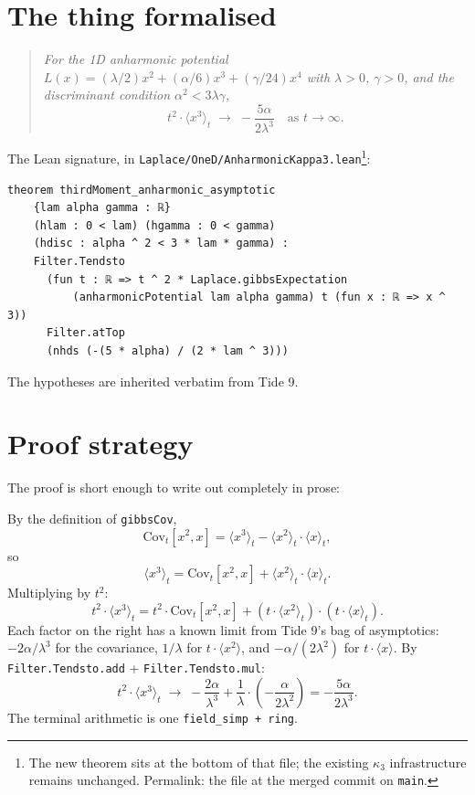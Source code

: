 \documentclass[11pt]{article}
\begin{document}
\section{The thing formalised}

\begin{quote}\itshape
For the 1D anharmonic potential
$L(x) = (\lambda/2) x^2 + (\alpha/6) x^3 + (\gamma/24) x^4$ with
$\lambda > 0$, $\gamma > 0$, and the discriminant condition
$\alpha^2 < 3\lambda\gamma$,
\[
  t^2 \cdot \langle x^3 \rangle_t
  \;\longrightarrow\; -\frac{5\alpha}{2\lambda^3}
  \quad \text{as } t \to \infty.
\]
\end{quote}

The Lean signature, in
\texttt{Laplace/OneD/AnharmonicKappa3.lean}\footnote{The new theorem
sits at the bottom of that file; the existing $\kappa_3$ infrastructure
remains unchanged. Permalink:
the file at the merged commit on \texttt{main}.}:

\begin{verbatim}
theorem thirdMoment_anharmonic_asymptotic
    {lam alpha gamma : ℝ}
    (hlam : 0 < lam) (hgamma : 0 < gamma)
    (hdisc : alpha ^ 2 < 3 * lam * gamma) :
    Filter.Tendsto
      (fun t : ℝ => t ^ 2 * Laplace.gibbsExpectation
          (anharmonicPotential lam alpha gamma) t (fun x : ℝ => x ^ 3))
      Filter.atTop
      (nhds (-(5 * alpha) / (2 * lam ^ 3)))
\end{verbatim}

The hypotheses are inherited verbatim from Tide 9.

\section{Proof strategy}

The proof is short enough to write out completely in prose:

By the definition of \texttt{gibbsCov},
\[
  \mathrm{Cov}_t[x^2, x] = \langle x^3 \rangle_t - \langle x^2 \rangle_t \cdot \langle x \rangle_t,
\]
so
\[
  \langle x^3 \rangle_t = \mathrm{Cov}_t[x^2, x] + \langle x^2 \rangle_t \cdot \langle x \rangle_t.
\]
Multiplying by $t^2$:
\[
  t^2 \cdot \langle x^3 \rangle_t
  = t^2 \cdot \mathrm{Cov}_t[x^2, x]
    + (t \cdot \langle x^2 \rangle_t) \cdot (t \cdot \langle x \rangle_t).
\]
Each factor on the right has a known limit from Tide 9's bag of
asymptotics: $-2\alpha/\lambda^3$ for the covariance, $1/\lambda$ for
$t \cdot \langle x^2 \rangle$, and $-\alpha/(2\lambda^2)$ for
$t \cdot \langle x \rangle$. By \texttt{Filter.Tendsto.add} +
\texttt{Filter.Tendsto.mul}:
\[
  t^2 \cdot \langle x^3 \rangle_t
  \;\longrightarrow\;
  -\frac{2\alpha}{\lambda^3}
  + \frac{1}{\lambda} \cdot \left(-\frac{\alpha}{2\lambda^2}\right)
  = -\frac{5\alpha}{2\lambda^3}.
\]
The terminal arithmetic is one \texttt{field\_simp + ring}.
\end{document}
